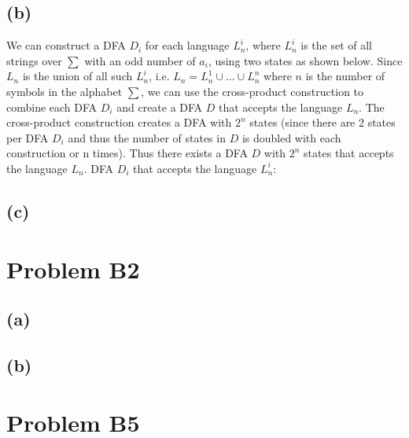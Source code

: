 \documentclass[12pt]{article}
\begin{document}
\subsection*{(b)}
  We can construct a DFA $D_i$ for each language $L^i_n$, where $L^i_n$ is the
  set of all strings over $\sum$ with an odd number of $a_i$, using two states
  as shown below. Since $L_n$ is the union of all such $L^i_n$, i.e.
  $L_n = L^1_n \cup \dots \cup L^n_n$ where $n$ is the number of symbols in the
  alphabet $\sum$, we can use the cross-product construction to combine each
  DFA $D_i$ and create a DFA $D$ that accepts the language $L_n$.
  The cross-product construction creates a DFA with $2^n$ states (since there
  are 2 states per DFA $D_i$ and thus the number of states in $D$ is doubled
  with each construction or n times). Thus there exists a DFA $D$ with $2^n$
  states that accepts the language $L_n$.
  \vspace{0.5cm}
  DFA $D_i$ that accepts the language $L^i_n$:
  \newline
  \begin{center}
  \end{center}

\subsection*{(c)}
\section*{Problem B2}
\subsection*{(a)}
\subsection*{(b)}

\section*{Problem B5}
\end{document}
